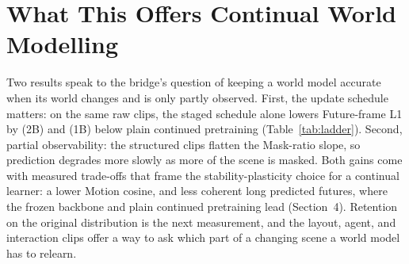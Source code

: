 \documentclass[letterpaper]{article} %
\begin{document}








\section{What This Offers Continual World Modelling}

Two results speak to the bridge's question of keeping a world model accurate when its world changes and is only partly observed. First, the update schedule matters: on the same raw clips, the staged schedule alone lowers Future-frame L1 by \nRawFutTwoB{} (2B) and \nRawFutOneB{} (1B) below plain continued pretraining (Table~\ref{tab:ladder}). Second, partial observability: the structured clips flatten the Mask-ratio slope, so prediction degrades more slowly as more of the scene is masked. Both gains come with measured trade-offs that frame the stability-plasticity choice for a continual learner: a lower Motion cosine, and less coherent long predicted futures, where the frozen backbone and plain continued pretraining lead (Section~4). Retention on the original distribution is the next measurement, and the layout, agent, and interaction clips offer a way to ask which part of a changing scene a world model has to relearn.



\clearpage  %
{\small

}
\end{document}
